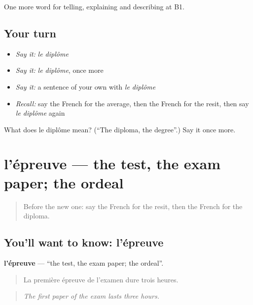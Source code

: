 \begin{grammarlens}[title={What you've built}]
One more word for telling, explaining and describing at B1.
\end{grammarlens}

\subsection*{Your turn}
\begin{itemize}
\raggedright
  \item \emph{Say it:} \emph{le diplôme}
  \item \emph{Say it:} \emph{le diplôme}, once more
  \item \emph{Say it:} a sentence of your own with \emph{le diplôme}
  \item \emph{Recall:} say the French for the average, then the French for the resit, then say \emph{le diplôme} again
\end{itemize}

\begin{tcolorbox}[breakable,colback=teal!4,colframe=teal!35!black,title={Before you move on}]
What does le diplôme mean? (\textquotedblleft{}The diploma, the degree\textquotedblright{}.) Say it once more.
\end{tcolorbox}
\section[l'épreuve]{l'épreuve — the test, the exam paper; the ordeal}

\label{lesson:FR-C379-epreuve}



\begin{quote}
Before the new one: say the French for the resit, then the French for the diploma.
\end{quote}

\subsection*{You'll want to know: l'épreuve}
\textbf{l'épreuve} — \textquotedblleft{}the test, the exam paper; the ordeal\textquotedblright{}.

\begin{quote}
La première épreuve de l'examen dure trois heures.
\end{quote}

\begin{quote}
\emph{The first paper of the exam lasts three hours.}
\end{quote}


